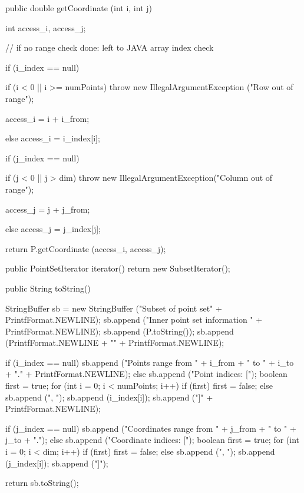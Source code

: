 \begin{code}\begin{hide}

   public double getCoordinate (int i, int j) {
      int access_i, access_j;

      // if no range check done: left to JAVA array index check
      
      if (i_index == null) {
         if (i < 0 || i >= numPoints)
            throw new IllegalArgumentException ("Row out of range");
         
         access_i = i + i_from;
      } else 
         access_i = i_index[i];

      if (j_index == null) {
         if (j < 0 || j > dim)
            throw new IllegalArgumentException("Column out of range");
         
         access_j = j + j_from;
      } else 
         access_j = j_index[j];

      return P.getCoordinate (access_i, access_j);
   }

   public PointSetIterator iterator() {
      return new SubsetIterator();
   }

   public String toString() {
      StringBuffer sb = new StringBuffer ("Subset of point set" +
              PrintfFormat.NEWLINE);
      sb.append ("Inner point set information {" + PrintfFormat.NEWLINE);
      sb.append (P.toString());
      sb.append (PrintfFormat.NEWLINE + "}" + PrintfFormat.NEWLINE);

      if (i_index == null)
         sb.append ("Points range from " + i_from + " to " + i_to + "." +
               PrintfFormat.NEWLINE);
      else {
         sb.append ("Point indices: [");
         boolean first = true;
         for (int i = 0; i < numPoints; i++) {
            if (first)
               first = false;
            else
               sb.append (", ");
            sb.append (i_index[i]);
         }
         sb.append ("]" + PrintfFormat.NEWLINE);
      }

      if (j_index == null)
         sb.append ("Coordinates range from " + j_from + " to " + j_to + ".");
      else {
         sb.append ("Coordinate indices: [");
         boolean first = true;
         for (int i = 0; i < dim; i++) {
            if (first)
               first = false;
            else
               sb.append (", ");
            sb.append (j_index[i]);
         }
         sb.append ("]");
      }

      return sb.toString();
   }



\end{hide}
\end{code}
